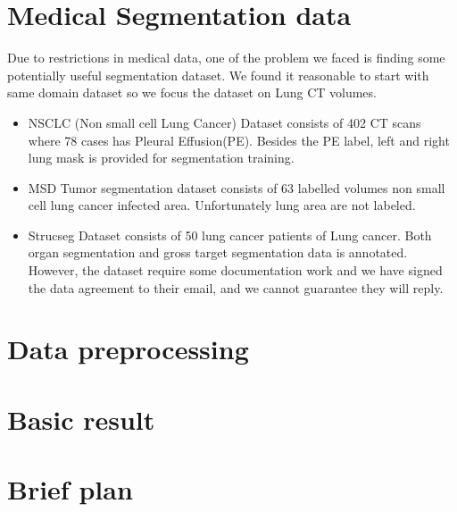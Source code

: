 \section{Medical Segmentation data}
Due to restrictions in medical data, one of the problem we faced is finding some potentially useful segmentation dataset. We found it reasonable to start with same domain dataset so we focus the dataset on Lung CT volumes.
\begin{itemize}
	\item NSCLC (Non small cell Lung Cancer) Dataset consists of 402 CT scans where 78 cases has Pleural Effusion(PE). Besides the PE label, left and right lung mask is provided for segmentation training.
	\item MSD Tumor segmentation dataset consists of 63 labelled volumes non small cell lung cancer infected area. Unfortunately lung area are not labeled.
	\item Strucseg Dataset consists of 50 lung cancer patients of Lung cancer. Both organ segmentation and gross target segmentation data is annotated. However, the dataset require some documentation work and we have signed the data agreement to their email, and we cannot guarantee they will reply.
	\end{itemize}
\section{Data preprocessing}
\section{Basic result}
\section{Brief plan}
